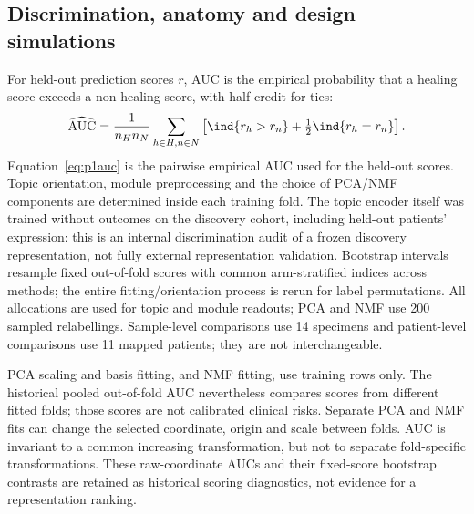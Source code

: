 \documentclass[10pt,a4paper]{article}
\begin{document}
\subsection{Discrimination, anatomy and design simulations}
For held-out prediction scores $r$, AUC is the empirical probability that a healing score exceeds a non-healing score, with half credit for ties:
\begin{equation}
\widehat{\rm AUC}=\frac1{n_Hn_N}\sum_{h\in H,n\in N}\left[\ind\{r_h>r_n\}+\tfrac12\ind\{r_h=r_n\}\right].\label{eq:p1auc}
\end{equation}
Equation~\eqref{eq:p1auc} is the pairwise empirical AUC used for the held-out scores. Topic orientation, module preprocessing and the choice of PCA/NMF components are determined inside each training fold. The topic encoder itself was trained without outcomes on the discovery cohort, including held-out patients' expression: this is an internal discrimination audit of a frozen discovery representation, not fully external representation validation. Bootstrap intervals resample fixed out-of-fold scores with common arm-stratified indices across methods; the entire fitting/orientation process is rerun for label permutations. All allocations are used for topic and module readouts; PCA and NMF use 200 sampled relabellings. Sample-level comparisons use 14 specimens and patient-level comparisons use 11 mapped patients; they are not interchangeable.

PCA scaling and basis fitting, and NMF fitting, use training rows only. The historical pooled out-of-fold AUC nevertheless compares scores from different fitted folds; those scores are not calibrated clinical risks. Separate PCA and NMF fits can change the selected coordinate, origin and scale between folds. AUC is invariant to a common increasing transformation, but not to separate fold-specific transformations. These raw-coordinate AUCs and their fixed-score bootstrap contrasts are retained as historical scoring diagnostics, not evidence for a representation ranking.
\end{document}
